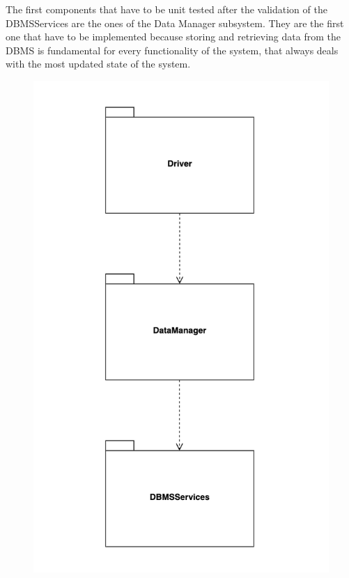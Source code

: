 \documentclass[]{article}
\begin{document}
The first components that have to be unit tested after the validation of the DBMSServices are the ones of the Data Manager subsystem. They are the first one that have to be implemented because storing and retrieving data from the DBMS is fundamental for every functionality of the system, that always deals with the most updated state of the system. 
				\begin{figure}[H]
					\centering
					\includegraphics[scale=0.7]{Testing/Testing1.png}
					\caption{}
					\label{fig:Testing}
				\end{figure}
\end{document}
